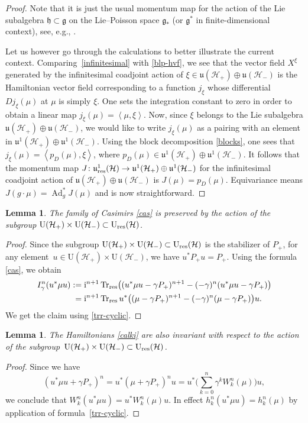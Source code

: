 \documentclass[10pt,a4paper]{amsart}
\newtheorem{lem}[thm]{Lemma}
\theoremstyle{definition}
\numberwithin{equation}{section}
\newcommand{\pair}[2]{\left\langle #1 , #2 \right\rangle}
\renewcommand{\H}{\mathcal{H}}
\newcommand{\g}{\mathfrak{g}}
\newcommand{\Up}{\mathrm{U}(\H_+)}\newcommand{\Um}{\mathrm{U}(\H_-)}
\newcommand{\Ur}{\mathrm{U}_{\textnormal{res}}(\H)}
\newcommand{\uup}{\mathfrak u(\H_+)}\newcommand{\uum}{\mathfrak u(\H_-)}
\newcommand{\uujp}{\mathfrak u^1(\H_+)}\newcommand{\uujm}{\mathfrak u^1(\H_-)}
\newcommand{\urp}{\mathfrak u_{\textnormal{res}}^1(\H)}
\DeclareMathOperator{\Trr}{Tr_{res}}
\DeclareMathOperator{\Ad}{Ad}
\begin{document}
\begin{proof}
Note that it is just the usual momentum map for the action of the Lie subalgebra $\mathfrak h\subset \g$ on the Lie--Poisson space $\g_*$ (or $\g^*$ in finite-dimensional context), see, e.g., \cite[Example~11.4.g]{ratiu-ms}.

Let us however go through the calculations to better illustrate the current context.
Comparing~\eqref{infinitesimal} with \eqref{blp-hvf}, we see that the vector field $X^\xi$ generated by the infinitesimal coadjoint action of $\xi\in \uup\oplus\uum$ is the Hamiltonian vector field corresponding to a function $j_\xi$ whose differential $Dj_\xi(\mu)$ at $\mu$ is simply $\xi$. One sets the integration constant to zero in order to obtain a linear map
$ j_\xi(\mu) = \pair\mu\xi$.
Now, since $\xi$ belongs to the Lie subalgebra $\uup\oplus\uum$, we would like to write $j_\xi(\mu)$ as a pairing with an element in $\uujp\oplus\uujm$. Using the block decomposition \eqref{blocks}, one sees that
$ j_\xi(\mu) = \pair{p_D(\mu)}\xi$,
where $p_D(\mu)\in \uujp\oplus\uujm$. It follows that the momentum map $J\colon \urp\rightarrow \uujp\oplus\uujm$ for the infinitesimal coadjoint action of $\uup\oplus\uum$ is
$ J(\mu) = p_D(\mu)$.
Equivariance means
$J(g\cdot\mu) = \Ad^*_g J(\mu)$
and is now straightforward.
\end{proof}


\begin{lem}
The family of Casimirs \eqref{cas} is preserved by the action of the subgroup $\Up\times\Um\subset \Ur$.
\end{lem}
\begin{proof}
Since the subgroup $\Up\times\Um\subset \Ur$ is the stabilizer of $P_+$, for any element~${u\in\Up\times\Um}$, we have $u^* P_+ u = P_+$. Using the formula \eqref{cas}, we obtain
\begin{align*} I^n_\gamma(u^* \mu u):={}&{\rm i}^{n+1}\Trr\bigl( (u^*\mu u-\gamma P_+)^{n+1}-(-\gamma)^{n}(u^*\mu u-\gamma P_+)\bigr)\\
={}&
 {\rm i}^{n+1}\Trr u^*\bigl( (\mu-\gamma P_+)^{n+1}-(-\gamma)^{n}(\mu-\gamma P_+)\bigr)u.\end{align*}
We get the claim using \eqref{trr-cyclic}.
\end{proof}

\begin{lem}
The Hamiltonians \eqref{calki} are also invariant with respect to the action of the subgroup~${\Up\times\Um\subset \Ur}$.
\end{lem}
\begin{proof}
Since we have
\[ (u^* \mu u+\gamma P_+)^n=u^*(\mu +\gamma P_+)^n u=u^*\Biggl(\sum_{k=0}^n\gamma^k W_k^n(\mu)\Biggr)u, \]
we conclude that
$W^n_k(u^*\mu u) = u^* W^n_k(\mu) u$.
In effect $h^n_k(u^*\mu u) = h^n_k(\mu)$ by application of formula~\eqref{trr-cyclic}.
\end{proof}
\end{document}
